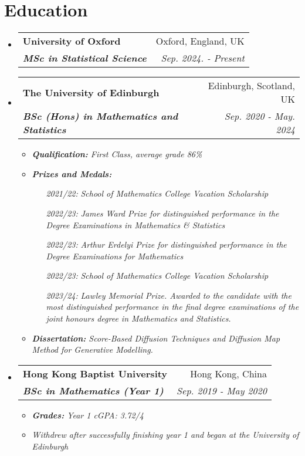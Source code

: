 \documentclass[12pt, a4paper]{article}
\makeatletter
\newcommand{\resumeSection}[1]{
    \section*{#1}
}
\newcommand{\resumeSectionItm}[4]{
\item
    \begin{tabular*}{0.96\textwidth}{@{}l@{\extracolsep{\fill}}r@{}}
        \textbf{#1} & #2 \\
        \textit{\textbf{#3}} & \textit{#4}
    \end{tabular*}
}
\makeatother
\begin{document}
\resumeSection{Education}
\begin{itemize}[leftmargin=*]
    \resumeSectionItm
	{University of Oxford}{Oxford, England, UK}
    {MSc in Statistical Science}{Sep. 2024. - Present}
\end{itemize}
\begin{itemize}[leftmargin=*]
    \resumeSectionItm
    {The University of Edinburgh}{Edinburgh, Scotland, UK}
    {BSc (Hons) in Mathematics and Statistics}{Sep. 2020 - May. 2024}
    \begin{itemize}[leftmargin=*]
        \vspace{-1mm}
        \item \it{\textbf{Qualification:} First Class, average grade 86\%}
        \item \it{\textbf{Prizes and Medals:}}
            \begin{itemize}[
                align=left,
                leftmargin=4em,
                itemindent=0.5pt,
                labelsep=0pt,
                labelwidth=4em
                ]
                \item [\it{2021/22:}]
                    \it{School of Mathematics College Vacation Scholarship}
                \item [\it{2022/23:}]
                    \it{James Ward Prize for distinguished performance in the
                        Degree Examinations in Mathematics \& Statistics}
                \item [\it{2022/23:}]
                    \it{Arthur Erdelyi Prize for distinguished
                    performance in the Degree Examinations for Mathematics}
                \item [\it{2022/23:}]
                    \it{School of Mathematics College Vacation Scholarship}
                \item [\it{2023/24:}]
                    \it{Lawley Memorial Prize. Awarded to the candidate with the most distinguished performance in the final degree examinations of the joint honours degree in Mathematics and Statistics.}
            \end{itemize}
        \item \it{\textbf{Dissertation:} Score-Based Diffusion Techniques and Diffusion Map Method for Generative Modelling.}
    \end{itemize}
\end{itemize}
\vspace{-5.5mm}
\begin{itemize}[leftmargin=*]
    \resumeSectionItm
    {Hong Kong Baptist University}{Hong Kong, China}
    {BSc in Mathematics (Year 1)}{Sep. 2019 - May 2020}
    \vspace{-1.5mm}
    \begin{itemize}[leftmargin=*]
        \item \it{\textbf{Grades:}}
            \textit{Year 1 cGPA: 3.72/4}
        \footnotesize \item \textit{\footnotesize Withdrew after successfully
            finishing year 1 and began at the University of Edinburgh}
    \end{itemize}
\end{itemize}
\end{document}
